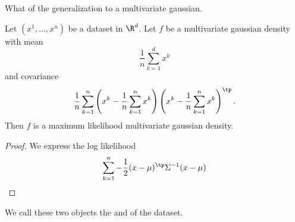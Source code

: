 
\sbasic


















































\sstart
{}


What of the generalization to a multivariate gaussian.


\begin{prop}
Let $(x^1, \dots, x^n)$ be a dataset in $\R^d$.
Let $f$ be a multivariate gaussian density with
mean
\[
  \frac{1}{n} \sum_{k = 1}^{d} x^k
\]
and covariance
\[
  \frac{1}{n}
  \sum_{k = 1}^{n}
  \left(x^k - \frac{1}{n} \sum_{k = 1}^{n} x^k\right)
  \left(x^k - \frac{1}{n} \sum_{k = 1}^{n} x^k\right)^\tp
  .
\]
Then $f$ is a maximum likelihood multivariate gaussian
density.
\begin{proof}
  We express the log likelihood
  \[
    \sum_{k = 1}^{n} -\frac{1}{2}(x - \mu)^\tp \Sigma^{-1} (x-\mu)
  \]
\end{proof}
\end{prop}
We call these two objects
the 
and 
of the dataset.
\strats
